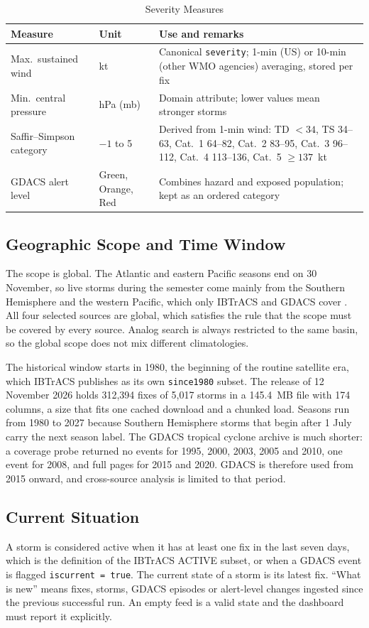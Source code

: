 \documentclass[10pt,twocolumn,letterpaper]{article}
\newcommand{\code}[1]{\texttt{\footnotesize #1}}
\begin{document}
\begin{table}[t]
\caption{Severity Measures}\label{tab:severity}
\centering\footnotesize
\begin{tabularx}{\columnwidth}{@{}L{1.75cm}L{1.15cm}Y@{}}
\toprule
Measure & Unit & Use and remarks\\
\midrule
Max.\ sustained wind & kt & Canonical \code{severity}; 1-min (US) or 10-min (other WMO agencies) averaging, stored per fix\\
Min.\ central pressure & hPa (mb) & Domain attribute; lower values mean stronger storms\\
Saffir--Simpson category & $-1$ to 5 & Derived from 1-min wind: TD $<34$, TS 34--63, Cat.~1 64--82, Cat.~2 83--95, Cat.~3 96--112, Cat.~4 113--136, Cat.~5 $\geq 137$~kt \cite{sshws}\\
GDACS alert level & Green, Orange, Red & Combines hazard and exposed population; kept as an ordered category\\
\bottomrule
\end{tabularx}
\end{table}

\subsection{Geographic Scope and Time Window}
The scope is global. The Atlantic and eastern Pacific seasons end on 30 November, so live storms during the semester come mainly from the Southern Hemisphere and the western Pacific, which only IBTrACS and GDACS cover \cite{teams}. All four selected sources are global, which satisfies the rule that the scope must be covered by every source. Analog search is always restricted to the same basin, so the global scope does not mix different climatologies.

The historical window starts in 1980, the beginning of the routine satellite era, which IBTrACS publishes as its own \code{since1980} subset. The release of 12 November 2026 holds 312{,}394 fixes of 5{,}017 storms in a 145.4~MB file with 174 columns, a size that fits one cached download and a chunked load. Seasons run from 1980 to 2027 because Southern Hemisphere storms that begin after 1 July carry the next season label. The GDACS tropical cyclone archive is much shorter: a coverage probe returned no events for 1995, 2000, 2003, 2005 and 2010, one event for 2008, and full pages for 2015 and 2020. GDACS is therefore used from 2015 onward, and cross-source analysis is limited to that period.

\subsection{Current Situation}
A storm is considered active when it has at least one fix in the last seven days, which is the definition of the IBTrACS ACTIVE subset, or when a GDACS event is flagged \code{iscurrent = true}. The current state of a storm is its latest fix. ``What is new'' means fixes, storms, GDACS episodes or alert-level changes ingested since the previous successful run. An empty feed is a valid state and the dashboard must report it explicitly.
\end{document}
